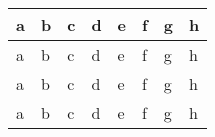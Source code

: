 \begin{table}[]
\begin{tabular}{|l|l|l|lllll|}
a                     & b                       & c                      & \multicolumn{1}{l|}{d}         & \multicolumn{1}{l|}{e}              & \multicolumn{1}{l|}{f}                       & \multicolumn{1}{l|}{g}          & h        \\ \hline
a                     & b                       & c                      & \multicolumn{1}{l|}{d}         & \multicolumn{1}{l|}{e}              & \multicolumn{1}{l|}{f}                       & \multicolumn{1}{l|}{g}          & h        \\ \hline
a                     & b                       & c                      & \multicolumn{1}{l|}{d}         & \multicolumn{1}{l|}{e}              & \multicolumn{1}{l|}{f}                       & \multicolumn{1}{l|}{g}          & h        \\ \hline
a                     & b                       & c                      & \multicolumn{1}{l|}{d}         & \multicolumn{1}{l|}{e}              & \multicolumn{1}{l|}{f}                       & \multicolumn{1}{l|}{g}          & h        \\ \hline
\end{tabular}
\end{table}